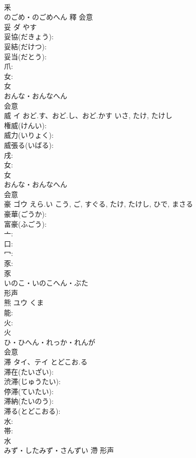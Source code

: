\documentclass[8pt]{extreport}
\begin{document}
\begin{CJK}{UTF8}{min}
\\	釆	
\\	のごめ・のごめへん	釋	会意 
\\	妥	ダ		やす	
\\	妥協(だきょう): 
\\	妥結(だけつ): 
\\	妥当(だとう): 
\\	爪: 
\\	女: 
\\	女	
\\	おんな・おんなへん	
\\	会意 
\\	威	イ	おど.す、おど.し、おど.かす	いさ, たけ, たけし	
\\	権威(けんい): 
\\	威力(いりょく): 
\\	威張る(いばる): 
\\	戌: 
\\	女: 
\\	女	
\\	おんな・おんなへん	
\\	会意 
\\	豪	ゴウ	えら.い	こう, ご, すぐる, たけ, たけし, ひで, まさる	
\\	豪華(ごうか): 
\\	富豪(ふごう): 
\\	亠: 
\\	口: 
\\	冖: 
\\	豕: 
\\	豕	
\\	いのこ・いのこへん・ぶた	
\\	形声 
\\	熊	ユウ	くま		
\\	能: 
\\	火: 
\\	火	
\\	ひ・ひへん・れっか・れんが	
\\	会意 
\\	滞	タイ、テイ	とどこお.る		
\\	滞在(たいざい): 
\\	渋滞(じゅうたい): 
\\	停滞(ていたい): 
\\	滞納(たいのう): 
\\	滞る(とどこおる): 
\\	水: 
\\	帯: 
\\	水	
\\	みず・したみず・さんずい	滯	形声 

\end{CJK}
\end{document}

